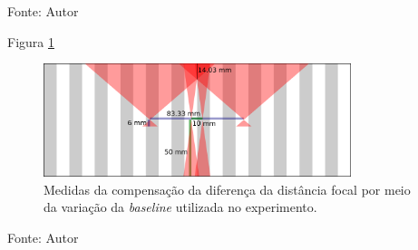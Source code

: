 Fonte: Autor

\pagebreak

Figura \ref{fig:50m_and_logitec_equi} 

\begin{figure}[!htb]
  \centering
  \caption{Medidas da compensação da diferença da distância focal por meio da variação da \textit{baseline} utilizada no experimento.}
  \label{fig:50m_and_logitec_equi}
  \includegraphics[width=0.80\textwidth]{./img/fundamentacao/50m_and_logitec_equi.png}
\end{figure}

Fonte: Autor

\pagebreak




    

    
    
    


